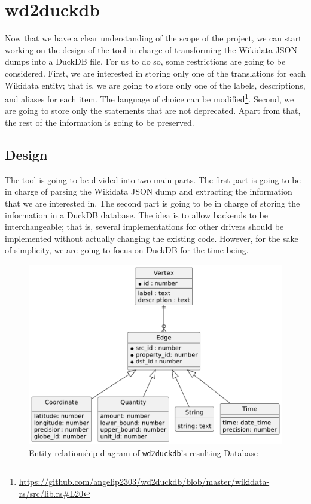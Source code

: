 \section{wd2duckdb}

Now that we have a clear understanding of the scope of the project, we can start working on the design of the tool in charge of transforming the Wikidata JSON dumps into a DuckDB file. For us to do so, some restrictions are going to be considered. First, we are interested in storing only one of the translations for each Wikidata entity; that is, we are going to store only one of the labels, descriptions, and aliases for each item. The language of choice can be modified\footnote{\url{https://github.com/angelip2303/wd2duckdb/blob/master/wikidata-rs/src/lib.rs\#L20}}. Second, we are going to store only the statements that are not deprecated. Apart from that, the rest of the information is going to be preserved.

\label{section:wd2duckdb_design}
\subsection{Design}

The tool is going to be divided into two main parts. The first part is going to be in charge of parsing the Wikidata JSON dump and extracting the information that we are interested in. The second part is going to be in charge of storing the information in a DuckDB database. The idea is to allow backends to be interchangeable; that is, several implementations for other drivers should be implemented without actually changing the existing code. However, for the sake of simplicity, we are going to focus on DuckDB for the time being.

\begin{figure}[ht]
    \centering
    \includegraphics[width=.8\linewidth]{figures/diagrams/10-1_wd2duckdb.pdf}
    \caption{Entity-relationship diagram of \texttt{wd2duckdb}'s resulting Database}
\end{figure}%

